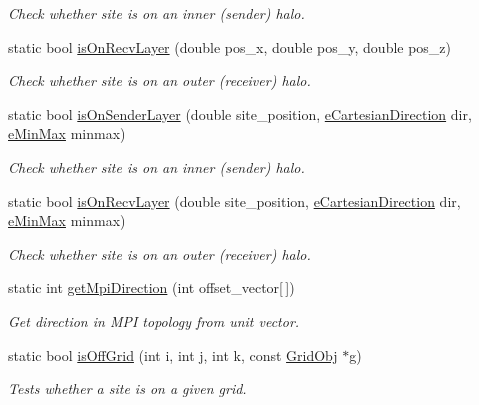\begin{DoxyCompactItemize}
\begin{DoxyCompactList}\small\item\em Check whether site is on an inner (sender) halo. \end{DoxyCompactList}\item 
static bool \hyperlink{class_grid_utils_abfec29d90b6942de2f3c52c225a4d888}{is\+On\+Recv\+Layer} (double pos\+\_\+x, double pos\+\_\+y, double pos\+\_\+z)
\begin{DoxyCompactList}\small\item\em Check whether site is on an outer (receiver) halo. \end{DoxyCompactList}\item 
static bool \hyperlink{class_grid_utils_a595b78d268cdbc0e6a3b008ac93e0cb4}{is\+On\+Sender\+Layer} (double site\+\_\+position, \hyperlink{_grid_utils_8h_afbad8e4a2f1e9903755b1bd2fe8273cf}{e\+Cartesian\+Direction} dir, \hyperlink{_grid_utils_8h_a8e005b039da2246588381c4feeeac43f}{e\+Min\+Max} minmax)
\begin{DoxyCompactList}\small\item\em Check whether site is on an inner (sender) halo. \end{DoxyCompactList}\item 
static bool \hyperlink{class_grid_utils_a0fb32f233e85584a04856c6c67299d68}{is\+On\+Recv\+Layer} (double site\+\_\+position, \hyperlink{_grid_utils_8h_afbad8e4a2f1e9903755b1bd2fe8273cf}{e\+Cartesian\+Direction} dir, \hyperlink{_grid_utils_8h_a8e005b039da2246588381c4feeeac43f}{e\+Min\+Max} minmax)
\begin{DoxyCompactList}\small\item\em Check whether site is on an outer (receiver) halo. \end{DoxyCompactList}\item 
static int \hyperlink{class_grid_utils_a1a59da2eb58afd9e785b45b23ad962df}{get\+Mpi\+Direction} (int offset\+\_\+vector\mbox{[}$\,$\mbox{]})
\begin{DoxyCompactList}\small\item\em Get direction in M\+PI topology from unit vector. \end{DoxyCompactList}\item 
static bool \hyperlink{class_grid_utils_acb35c1a485e74c0b2794b84573b5e50f}{is\+Off\+Grid} (int i, int j, int k, const \hyperlink{class_grid_obj}{Grid\+Obj} $\ast$g)
\begin{DoxyCompactList}\small\item\em Tests whether a site is on a given grid. \end{DoxyCompactList}\item 

\end{DoxyCompactItemize}
